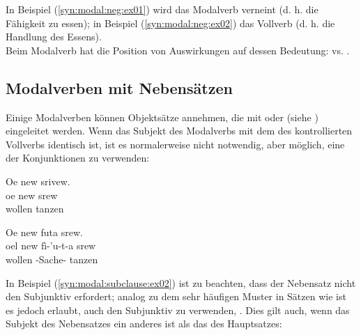 \noindent In Beispiel (\ref{syn:modal:neg:ex01}) wird das Modalverb verneint (d. h. die Fähigkeit zu essen); in Beispiel (\ref{syn:modal:neg:ex02}) das Vollverb (d. h. die Handlung des Essens). \\
\indent Beim Modalverb   hat die Position von  Auswirkungen auf dessen Bedeutung:   vs.  .

\subsection{Modalverben mit Nebensätzen}
\label{syn:modal:new}\label{syn:modal:subclause}
Einige Modalverben können Objektsätze annehmen, die mit  oder  (siehe ) eingeleitet werden. Wenn das Subjekt des Modalverbs mit dem des kontrollierten Vollverbs identisch ist, ist es normalerweise nicht notwendig, aber möglich, eine der Konjunktionen zu verwenden:

 
 
 

\begin{interlin}
	\glll \Npawl{}Oe new srivew. \\
	oe new srew \\
	 wollen tanzen \\
\end{interlin}

\begin{interlin}\label{syn:modal:subclause:ex02}
	\glll \Npawl{}Oe new futa srew. \\
	oel new fì-'u-t-a srew \\
	 wollen -Sache- tanzen\\
\end{interlin}

\noindent In Beispiel (\ref{syn:modal:subclause:ex02}) ist zu beachten, dass der Nebensatz nicht den Subjunktiv erfordert; analog zu dem sehr häufigen Muster in Sätzen wie  ist es jedoch erlaubt, auch den Subjunktiv zu verwenden, . Dies gilt auch, wenn das Subjekt des Nebensatzes ein anderes ist als das des Hauptsatzes:

